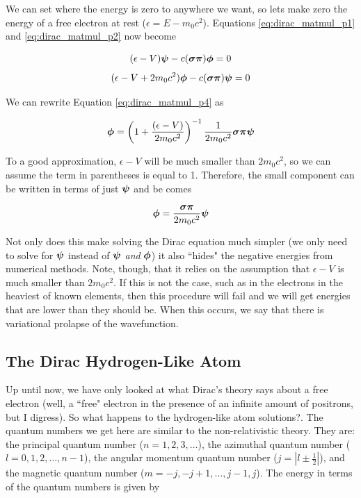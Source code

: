 \documentclass[12pt]{report}
\begin{document}
We can set where the energy is zero to anywhere we want, so lets make zero the energy of a free electron at rest ($\epsilon = E - m_{0}c^{2}$). Equations \ref{eq:dirac_matmul_p1} and \ref{eq:dirac_matmul_p2} now become

\begin{equation}
\label{eq:dirac_matmul_p3}
(\epsilon - V){\bf{\psi}} - c({\bf{\sigma\pi}}){\bf{\phi}} = 0
\end{equation}
\begin{equation}
\label{eq:dirac_matmul_p4}
(\epsilon - V + 2m_{0}c^{2}){\bf{\phi}} - c({\bf{\sigma\pi}}){\bf{\psi}} = 0
\end{equation}

We can rewrite Equation \ref{eq:dirac_matmul_p4} as

\begin{equation}
\label{eq:dirac_small_comp}
{\bf{\phi}} = \left(1 + \frac{(\epsilon - V)}{2m_{0}c^{2}}\right)^{-1}\frac{1}{2m_{0}c^{2}}{\bf{\sigma\pi}}{\bf{\psi}}
\end{equation}

To a good approximation, $\epsilon - V$ will be much smaller than $2m_{0}c^{2}$, so we can assume the term in parentheses is equal to 1. Therefore, the small component can be written in terms of just ${\bf{\psi}}$ and be comes

\begin{equation}
\label{eq:dirac_small_comp_simp}
{\bf{\phi}} = \frac{{\bf{\sigma\pi}}}{2m_{0}c^{2}}{\bf{\psi}}
\end{equation}

Not only does this make solving the Dirac equation much simpler (we only need to solve for ${\bf{\psi}}$ instead of ${\bf{\psi}}$ \textit{and} ${\bf{\phi}}$) it also ``hides" the negative energies from numerical methods. Note, though, that it relies on the assumption that $\epsilon - V$ is much smaller than $2m_{0}c^{2}$. If this is not the case, such as in the electrons in the heaviest of known elements, then this procedure will fail and we will get energies that are lower than they should be. When this occurs, we say that there is variational prolapse of the wavefunction.

\subsection{The Dirac Hydrogen-Like Atom}
Up until now, we have only looked at what Dirac's theory says about a free electron (well, a ``free" electron in the presence of an infinite amount of positrons, but I digress). So what happens to the hydrogen-like atom solutions?. The quantum numbers we get here are similar to the non-relativistic theory. They are: the principal quantum number ($n=1,2,3,\ldots$), the azimuthal quantum number ($l = 0, 1, 2, \ldots, n-1$), the angular momentum quantum number ($j = | l \pm \frac{1}{2}|$), and the magnetic quantum number ($m = -j,-j+1, \ldots, j-1, j$). The energy in terms of the quantum numbers is given by
\end{document}
